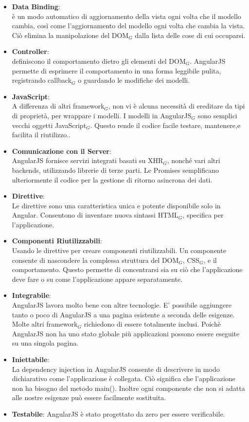 \begin{itemize}
	\item \textbf{Data Binding}:\\
	è un modo automatico di aggiornamento della vista ogni volta che il modello cambia, così come l'aggiornamento del modello ogni volta che cambia la vista. Ciò  elimina la manipolazione del DOM$_G$ dalla lista delle cose di cui occuparsi.
	\item \textbf{Controller}:\\
	definiscono il comportamento dietro gli elementi del DOM$_G$. AngularJS permette di esprimere il comportamento in una forma leggibile pulita, registrando callback$_G$ o guardando le modifiche dei modelli.
	\item \textbf{JavaScript}:\\
	A differenza di altri framework$_G$, non vi è alcuna necessità di ereditare da tipi di proprietà, per wrappare i modelli. I modelli in AngularJS$_G$ sono semplici vecchi oggetti JavaScript$_G$. Questo rende il codice facile testare, mantenere,e facilita il riutilizzo..
	\item \textbf{ Comunicazione con il Server}:\\
	AngularJS fornisce servizi integrati basati su XHR$_G$, nonché vari altri backends, utilizzando librerie di terze parti. Le Promises semplificano ulteriormente il codice per la gestione di ritorno asincrona dei dati.
	\item \textbf{ Direttive}:\\
	Le direttive sono una caratteristica unica e potente disponibile solo in Angular. Consentono di inventare nuova sintassi HTML$_G$, specifica per l'applicazione.
	\item \textbf{ Componenti Riutilizzabili}:\\
	Usando le direttive per creare componenti riutilizzabili. Un componente consente di nascondere la complessa struttura del DOM$_G$, CSS$_G$, e il comportamento. Questo permette di concentrarsi sia su ciò che l'applicazione deve fare o su come l'applicazione appare separatamente.
	\item \textbf{ Integrabile}:\\
	AngularJS lavora molto bene con altre tecnologie. E' possibile aggiungere tanto o poco di AngularJS a una pagina esistente a seconda delle esigenze. Molte altri framework$_G$ richiedono di essere totalmente inclusi. Poichè AngularJS non ha uno stato globale più applicazioni possono essere eseguite su una singola pagina.
	\item \textbf{ Iniettabile}:\\
	La dependency injection in AngularJS consente di descrivere in modo dichiarativo come l'applicazione è collegata. Ciò significa che l'applicazione non ha bisogno del metodo main(). Inoltre ogni componente che non si adatta alle nostre esigenze può essere facilmente sostituita.
	\item \textbf{ Testabile}:
	AngularJS è stato progettato da zero per essere verificabile.
\end{itemize}

